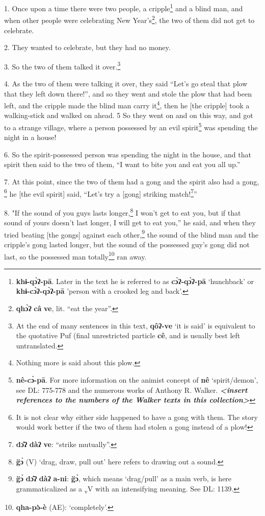 \setcounter{footnote}{0}

1. Once upon a time there were two people, a cripple\footnote{\textbf{khɨ-qɔ̀ʔ-pā}. Later in the text he is referred to as \textbf{cɔ̀ʔ-qɔ̀ʔ-pā} `hunchback' or \textbf{khɨ-cɔ̀ʔ-qɔ̀ʔ-pā} 'person with a crooked leg and back'.} and a blind man, and when
other people were celebrating New Year's\footnote{\textbf{qhɔ̀ʔ} \textbf{câ} \textbf{ve}, lit. ``eat the year''.}, the two of them did not get to celebrate.

2. They wanted to celebrate, but they had no money.

3. So the two of them talked it over.\footnote{At the end of many sentences in this text, \textbf{qôʔ-ve} `it is said' is equivalent to the quotative Puf (final unrestricted particle \textbf{cê}, and is usually best left untranslated.}

4. As the two of them were talking it over, they said ``Let's go steal that plow
that they left down there!'', and so they went and stole the plow that had been
left, and the cripple made the blind man carry it\footnote{Nothing more is said about this plow.}, then he [the cripple] took
a walking-stick and walked on ahead. 5 So they went on and on this way, and got
to a strange village, where a person possessed by an evil spirit\footnote{\textbf{nê-cɔ̀-pā}. For more information on the animist concept of \textbf{nê} `spirit/demon', see DL: 775-778 and the numerous works of Anthony R. Walker. \textit{\textbf{<insert references to the numbers of the Walker texts in this collection>}}} was spending
the night in a house!

6. So the spirit-possessed person was spending the night in the house, and that
spirit then said to the two of them, ``I want to bite you and eat you all up.''

7. At this point, since the two of them had a gong and the spirit also had a gong,
\footnote{It is not clear why either side happened to have a gong with them. The story would work better if the two of them had stolen a gong instead of a plow!} he [the evil spirit] said, ``Let's try a [gong] striking match!\footnote{\textbf{dɔ̂ʔ} \textbf{dàʔ} \textbf{ve}: ``strike mutually''.}''

8. "If the sound of you guys lasts longer,\footnote{\textbf{g̈ɔ̀} (V) `drag, draw, pull out' here refers to drawing out a sound.} I won't get to eat you,
but if that sound of yours doesn't last longer, I will get to eat you,'' he said,
and when they tried beating [the gongs] against each other,\footnote{\textbf{g̈ɔ̀} \textbf{dɔ̂ʔ} \textbf{dàʔ} \textbf{a-ni}: \textbf{g̈ɔ̀}, which means `drag/pull' as a main verb, is here grammaticalized as a \textsubscript{v}V with an intensifying meaning. See DL: 1139.} the sound of the
blind man and the cripple's gong lasted longer, but the sound of the possessed
guy's gong did not last, so the possessed man totally\footnote{\textbf{qha-pə̀-è} (AE): `completely'.} ran away.

